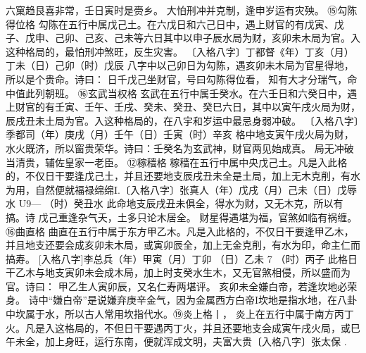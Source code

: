 六窠趋艮喜非常，壬日寅时是赍乡。
大怕刑冲并克制，逢申岁运有灾殃。
⑮勾陈得位格
勾陈在五行中属戊己土。在六戊日和六己日中，遇上财官的有戊寅、戊子、戊申、己卯、己亥、己未等六日其中以申子辰水局为财，亥卯未木局为官。入这种格局的，最怕刑冲煞旺，反生灾害。
〔入格八字〕丁都督《年）丁亥（月）丁未（日）己卯（时）戊辰
八字中以己卯日为勾陈，遇亥卯未木局为官星得地，所以是个贵命。诗曰：
日千戊己坐财官，号曰勾陈得位看，
知有大才分瑞气，命中值此列朝班。
⑯玄武当权格
玄武在五行中属壬癸水。在六壬日和六癸日中，遇上财官的有壬寅、壬午、壬戌、癸未、癸丑、癸巳六日，其中以寅午戌火局为财，辰戌丑未土局为官。入这种格局的，在八宇和岁运中最忌身弱冲破。
〔入格八字〕季都司（年）庚戌（月）壬午（日）壬寅（时）辛亥
格中地支寅午戌火局为财，水火既济，所以窗贵荣华。诗曰：壬癸名为玄武神，财官两见始成真。
局无冲破当清贵，辅佐皇家一老臣。
⑫稼穑格
稼穑在五行中属中央戊己土。凡是入此格的，不仅日干要逢戊己土，并且还要地支辰戌丑未全是土局，加上无木克削，有水为用，自然便就福禄绵绵I.〔入格八字〕张真人（年）戊戌（月）己未（日）戊辱水
U9—
（时）癸丑水
此命地支辰戌丑未俱全，得水为财，又无木克，所以有搞。诗
戊己重逢杂气夭，土多只论木居全。
财星得遇堪为福，官煞如临有祸缠。
⑯曲直格
曲直在五行中属于东方甲乙木。凡是入此格的，不仅日干要逢甲乙木，并且地支还要会成亥卯未木局，或寅卯辰全，加上无金克削，有水为印，命主仁而搞寿。
[入格八字]李总兵（年）甲寅（月）丁卯
（日）乙未	7
（时）丙子
此格日干乙木与地支寅卯未会成木局，加上时支癸水生木，又无官煞相侵，所以盛而为官。诗曰：
甲乙生人寅卯辰，又名仁寿两堪评。
亥卯未全嫌白帝，若逢坎地必荣身。
诗中“嫌白帝”是说嫌弃庚辛金气，因为金属西方白帝I坎地是指水地，在八卦中坎属于水，所以古人常用坎指代水。⑲炎上格丨，	
炎上在五行中属于南方丙丁火。凡是入这格局的，不但日干要遇丙丁火，并且还要地支会成寅午戌火局，或巳午未全，加上身旺，运行东南，便就浑成文明，夫富大贵〔入格八字〕张太保	.

